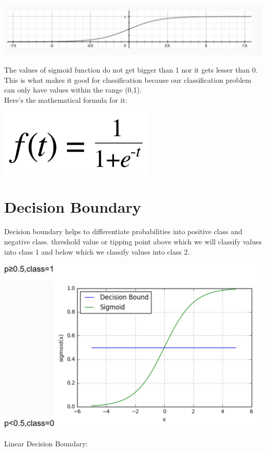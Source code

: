 \documentclass{42-en}
\begin{document}
\centerline{\includegraphics[width=150mm]{images/sigmoid_funct.png}}

The values of sigmoid function do not get bigger than 1 nor it gets lesser than 0. This is what makes it good for classification because our classification problem can only have values within the range (0,1).\\

Here’s the mathematical formula for it:\\

\centerline{\includegraphics[width=75mm]{images/sigmoid_formula.png}}

\section*{Decision Boundary}

Decision boundary helps to differentiate probabilities into positive class and negative class. threshold value or tipping point above which we will classify values into class 1 and below which we classify values into class 2.\\

\centerline{\includegraphics[width=150mm]{images/labelled_sigwthresh.png}}
\newpage
Linear Decision Boundary:\\
\end{document}
